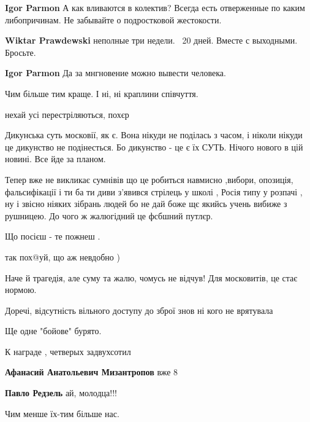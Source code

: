 \begin{itemize}
\begin{itemize}
\textbf{Igor Parmon} А как вливаются в колектив?
Всегда есть отверженные по каким либопричинам.
Не забывайте о подростковой жестокости.

\textbf{Wiktar Prawdewski} неполные три недели. ~20 дней. Вместе с выходными.
Бросьте.

\textbf{Igor Parmon} Да за мнгновение можно вывести человека.
\end{itemize} %

Чим більше тим краще. І ні, ні краплини співчуття.

нехай усі перестріляються, похєр


Дикунська суть московії, як є. Вона нікуди не поділась з часом, і ніколи нікуди
це дикунство не подінесться. Бо дикунство - це є їх СУТЬ. Нічого нового в цій
новині. Все йде за планом.



Тепер вже не викликає сумнівів що це робиться навмисно ,вибори, опозиція,
фальсифікації і ти ба ти диви з'явився стрілець у школі , Росія типу у розпачі
, ну і звісно ніяких зібрань людей бо не дай боже щє якийсь учень вибиже з
рушницею. До чого ж жалюгідний це фсбшний путлєр.

Що посієш - те пожнеш .

так пох@уй, що аж невдобно )

Наче й трагедія, але суму та жалю, чомусь не відчув! Для московитів, це стає нормою.

Доречі, відсутність вільного доступу до зброї знов ні кого не врятувала

Ще одне "бойове" бурято.

К награде , четверых задвухсотил

\begin{itemize} %
\textbf{Афанасий Анатольевич Мизантропов} вже 8

\textbf{Павло Редзель} ай, молодца!!!
\end{itemize} %

Чим менше їх-тим більше нас.



\end{itemize}
